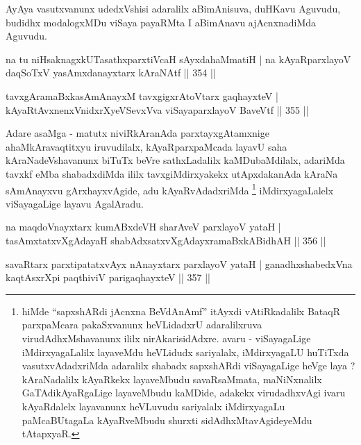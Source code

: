 \begin{artha}
AyAya vasutxvanunx udedxVshisi adaralilx aBimAnisuva, duHKavu Agu\-vudu, budidhx modalogxMDu viSaya payaRMta I aBimAnavu ajAcnxnadiMda Aguvudu.
\end{artha}


\begin{shl}
na tu niHsaknagxkUTasathxparxtiVcaH sAyxdahaMmatiH |
na kAyaRparxlayoV daqSoTxV yasAmxdanayxtarx kAraNAtf \hfill || 354 ||
\end{shl}

\begin{shl}
tavxgAramaBxkasAmAnayxM tavxgigxrA\s toV\s tarx gaqhayxteV |
kAyaRtAvxnenxVnidxrXyeVSevxVva viSayaparxlayoV BaveVtf \hfill || 355 ||
\end{shl}

\begin{artha}
Adare asaMga - matutx niviRkAranAda parxtayxgAtamxnige ahaMkAravaqtitxyu iruvudilalx, kAyaRparxpaMcada layavU saha kAraNadeVshavanunx biTuTx beVre sathxLadalilx kaMDubaMdilalx, adariMda tavxkf eMba shabadxdiMda ililx tavxgiMdirxyakekx utApxdakanAda kAraNa sAmAnayxvu gArxhayxvAgide, adu kAyaRvAdadxriMda \footnote[1]{hiMde ``sapxshARdi jAcnxna BeVdAnAmf'' itAyxdi vAtiRkadalilx BataqR parxpaMcara pakaSxvanunx heVLidadxrU adaralilxruva virudAdhxMshavanunx ililx nirAkarisidAdxre. avaru - viSayagaLige iMdirxyagaLalilx layaveMdu heVLidudx sariyalalx, iMdirxyagaLU huTiTxda vasutxvAdadxriMda adaralilx shabadx sapxshARdi viSayagaLige heVge laya ? kAraNadalilx kAyaRkekx layaveMbudu savaRsaMmata, maNiNxnalilx GaTAdikAyaRgaLige layaveMbudu kaMDide, adakekx virudadhxvAgi ivaru kAyaRdalelx layavanunx heVLuvudu sariyalalx iMdirxyagaLu paMcaBUtagaLa kAyaRveMbudu shurxti sidAdhxMtavAgideyeMdu tAtapxyaR.} iMdirxyagaLalelx viSayagaLige layavu AgalAradu.
\end{artha}

\begin{shl}
na maqdoV\s nayxtarx kumABxdeVH sharAveV parxlayoV yataH |
tasAmxtatxvXgAdayaH shabAdxsatxvXgAdayxramaBxkABidhAH \hfill || 356 ||
\end{shl}

\begin{shl}
savaRtarx parxtipatatxvAyx nAnayxtarx parxlayoV yataH |
ganadhxshabedxVna kaqtAsxrX\s pi paqthiviV parigaqhayxteV \hfill || 357 ||
\end{shl}

